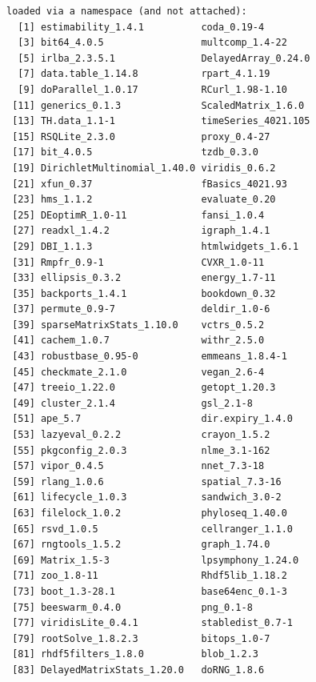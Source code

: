 \documentclass[
]{book}
\begin{document}
\begin{verbatim}
loaded via a namespace (and not attached):
  [1] estimability_1.4.1          coda_0.19-4                
  [3] bit64_4.0.5                 multcomp_1.4-22            
  [5] irlba_2.3.5.1               DelayedArray_0.24.0        
  [7] data.table_1.14.8           rpart_4.1.19               
  [9] doParallel_1.0.17           RCurl_1.98-1.10            
 [11] generics_0.1.3              ScaledMatrix_1.6.0         
 [13] TH.data_1.1-1               timeSeries_4021.105        
 [15] RSQLite_2.3.0               proxy_0.4-27               
 [17] bit_4.0.5                   tzdb_0.3.0                 
 [19] DirichletMultinomial_1.40.0 viridis_0.6.2              
 [21] xfun_0.37                   fBasics_4021.93            
 [23] hms_1.1.2                   evaluate_0.20              
 [25] DEoptimR_1.0-11             fansi_1.0.4                
 [27] readxl_1.4.2                igraph_1.4.1               
 [29] DBI_1.1.3                   htmlwidgets_1.6.1          
 [31] Rmpfr_0.9-1                 CVXR_1.0-11                
 [33] ellipsis_0.3.2              energy_1.7-11              
 [35] backports_1.4.1             bookdown_0.32              
 [37] permute_0.9-7               deldir_1.0-6               
 [39] sparseMatrixStats_1.10.0    vctrs_0.5.2                
 [41] cachem_1.0.7                withr_2.5.0                
 [43] robustbase_0.95-0           emmeans_1.8.4-1            
 [45] checkmate_2.1.0             vegan_2.6-4                
 [47] treeio_1.22.0               getopt_1.20.3              
 [49] cluster_2.1.4               gsl_2.1-8                  
 [51] ape_5.7                     dir.expiry_1.4.0           
 [53] lazyeval_0.2.2              crayon_1.5.2               
 [55] pkgconfig_2.0.3             nlme_3.1-162               
 [57] vipor_0.4.5                 nnet_7.3-18                
 [59] rlang_1.0.6                 spatial_7.3-16             
 [61] lifecycle_1.0.3             sandwich_3.0-2             
 [63] filelock_1.0.2              phyloseq_1.40.0            
 [65] rsvd_1.0.5                  cellranger_1.1.0           
 [67] rngtools_1.5.2              graph_1.74.0               
 [69] Matrix_1.5-3                lpsymphony_1.24.0          
 [71] zoo_1.8-11                  Rhdf5lib_1.18.2            
 [73] boot_1.3-28.1               base64enc_0.1-3            
 [75] beeswarm_0.4.0              png_0.1-8                  
 [77] viridisLite_0.4.1           stabledist_0.7-1           
 [79] rootSolve_1.8.2.3           bitops_1.0-7               
 [81] rhdf5filters_1.8.0          blob_1.2.3                 
 [83] DelayedMatrixStats_1.20.0   doRNG_1.8.6                

\end{verbatim}
\end{document}
